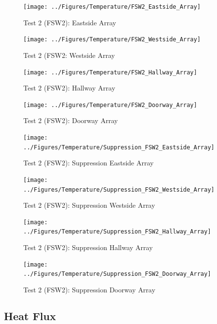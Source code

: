 \documentclass[12pt,oneside]{book}
\begin{document}
\begin{figure}[!ht]
	\texttt{[image: ../Figures/Temperature/FSW2\_Eastside\_Array]}
	\caption{Test 2 (FSW2): Eastside Array}
	\label{fig:Test_2_Eastside_Array}
\end{figure}

\begin{figure}[!ht]
	\texttt{[image: ../Figures/Temperature/FSW2\_Westside\_Array]}
	\caption{Test 2 (FSW2: Westside Array}
	\label{fig:Test_2_Westside_Array}
\end{figure}

\begin{figure}[!ht]
	\texttt{[image: ../Figures/Temperature/FSW2\_Hallway\_Array]}
	\caption{Test 2 (FSW2): Hallway Array}
	\label{fig:Test_2_Hallway_Array}
\end{figure}

\begin{figure}[!ht]
	\texttt{[image: ../Figures/Temperature/FSW2\_Doorway\_Array]}
	\caption{Test 2 (FSW2): Doorway Array}
	\label{fig:Test_2_Doorway_Array}
\end{figure}

\begin{figure}[!ht]
	\texttt{[image: ../Figures/Temperature/Suppression\_FSW2\_Eastside\_Array]}
	\caption{Test 2 (FSW2): Suppression Eastside Array}
	\label{fig:Test_2_Suppression_Eastside_Array}
\end{figure}

\begin{figure}[!ht]
	\texttt{[image: ../Figures/Temperature/Suppression\_FSW2\_Westside\_Array]}
	\caption{Test 2 (FSW2): Suppression Westside Array}
	\label{fig:Test_2_Suppression_Westside_Array}
\end{figure}

\begin{figure}[!ht]
	\texttt{[image: ../Figures/Temperature/Suppression\_FSW2\_Hallway\_Array]}
	\caption{Test 2 (FSW2): Suppression Hallway Array}
	\label{fig:Test_2_Suppression_Hallway_Array}
\end{figure}

\begin{figure}[!ht]
	\texttt{[image: ../Figures/Temperature/Suppression\_FSW2\_Doorway\_Array]}
	\caption{Test 2 (FSW2): Suppression Doorway Array}
	\label{fig:Test_2_Suppression_Doorway_Array}
\end{figure}

\subsection{Heat Flux}
\label{subsec:Heat_Flux}
\end{document}
